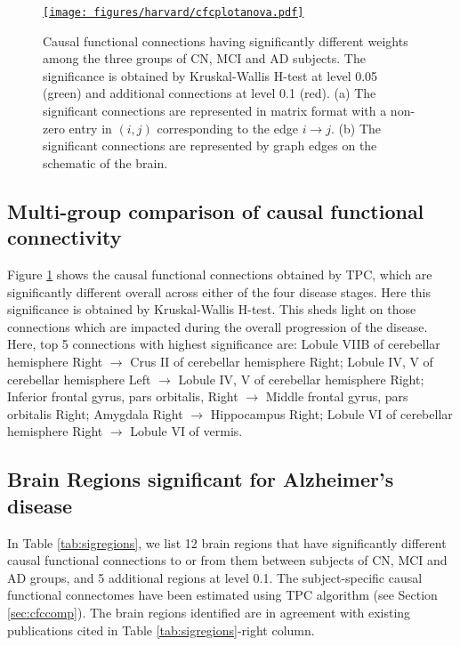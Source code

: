\documentclass[12pt,reqno]{amsart}
\theoremstyle{definition}
\begin{document}
\begin{figure}[t!]
\vspace{0.6in}
    \centering
    \href{https://drive.google.com/file/d/1eu-joYjSBWX3eMB2FG0cODw1qsmma-6d/view?usp=sharing}{\texttt{[image: figures/harvard/cfcplotanova.pdf]}}
    \caption{Causal functional connections having significantly different weights among the three groups of CN, MCI and AD subjects. The significance is obtained by Kruskal-Wallis H-test at level 0.05 (green) and additional connections at level 0.1 (red). (a) The significant connections are represented in matrix format with a non-zero entry in $(i,j)$ corresponding to the edge $i\rightarrow j$. (b) The significant connections are represented by graph edges on the schematic of the brain.}
    \label{fig:anovacomp}
\end{figure}


\subsection{Multi-group comparison of causal functional connectivity}
Figure \ref{fig:anovacomp} shows the causal functional connections obtained by TPC, which are significantly different overall across either of the four disease stages. Here this significance is obtained by Kruskal-Wallis H-test. This sheds light on those connections which are impacted during the overall progression of the disease. Here, top 5 connections with highest significance are: Lobule VIIB of cerebellar hemisphere Right $\rightarrow$ Crus II of cerebellar hemisphere Right; Lobule IV, V of cerebellar hemisphere Left $\rightarrow$ Lobule IV, V of cerebellar hemisphere Right; Inferior frontal gyrus, pars orbitalis, Right $\rightarrow$ Middle frontal gyrus, pars orbitalis Right; Amygdala Right $\rightarrow$ Hippocampus Right; Lobule VI of cerebellar hemisphere Right $\rightarrow$ Lobule VI of vermis.
\subsection{Brain Regions significant for Alzheimer's disease}
In Table \ref{tab:sigregions}, we list 12 brain regions that have significantly different causal functional connections to or from them between subjects of CN, MCI and AD groups, and 5 additional regions at level 0.1. The subject-specific causal functional connectomes have been estimated using TPC algorithm (see Section \ref{sec:cfccomp}). The brain regions identified are in agreement with existing publications cited in Table \ref{tab:sigregions}-right column.
\end{document}
